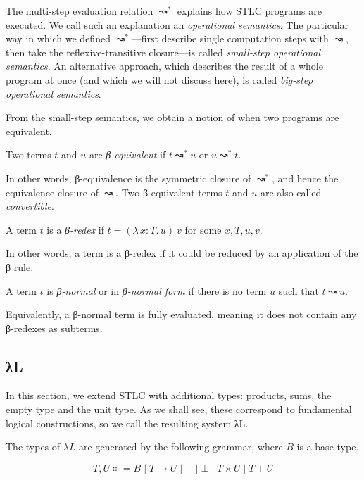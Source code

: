\documentclass{article}
\theoremstyle{definition}
\newcommand{\Lam}[2]{λ\,#1.\, #2}
\begin{document}
The multi-step evaluation relation $↝^{*}$ explains how STLC programs are executed.
We call such an explanation an \emph{operational semantics}.
The particular way in which we defined $↝^{*}$---first describe single computation steps with $↝$, then take the reflexive-transitive closure---is called \emph{small-step operational semantics}.
An alternative approach, which describes the result of a whole program at once (and which we will not discuss here), is called \emph{big-step operational semantics}.

From the small-step semantics, we obtain a notion of when two programs are equivalent.

\begin{definition}[β-equivalence]
  Two terms $t$ and $u$ are \emph{β-equivalent} if $t ↝^{*} u$ or $u ↝^{*} t$.
\end{definition}

In other words, β-equivalence is the symmetric closure of $↝^{*}$, and hence the equivalence closure of $↝$.
Two β-equivalent terms $t$ and $u$ are also called \emph{convertible}.

\begin{definition}[β-redex]
  A term $t$ is a \emph{β-redex} if $t = (\Lam{x : T}{u})~v$ for some $x,T,u,v$.
\end{definition}

In other words, a term is a β-redex if it could be reduced by an application of the β rule.

\begin{definition}
  A term $t$ is \emph{β-normal} or in \emph{β-normal form} if there is no term $u$ such that $t ↝ u$.
\end{definition}

Equivalently, a β-normal term is fully evaluated, meaning it does not contain any β-redexes as subterms.

\subsection{λL}

In this section, we extend STLC with additional types: products, sums, the empty type and the unit type.
As we shall see, these correspond to fundamental logical constructions, so we call the resulting system λL.

\begin{definition}[Types]
  The types of $λL$ are generated by the following grammar, where $B$ is a base type.

  \[
    T,U ∷= B \mid T → U \mid ⊤ \mid ⊥ \mid T × U \mid T + U
  \]
\end{definition}
\end{document}
